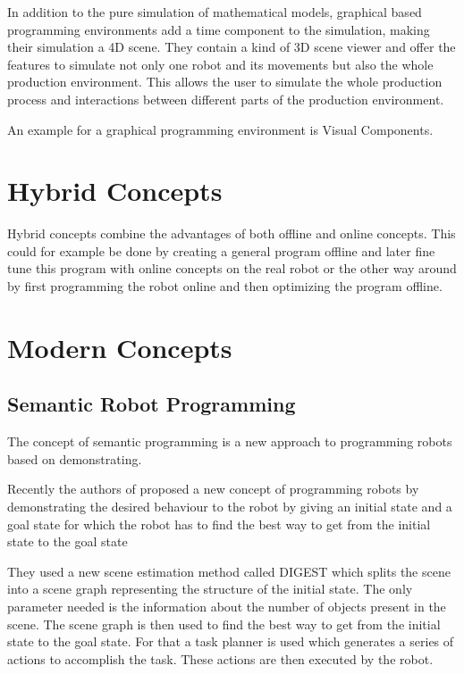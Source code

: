 \documentclass[conference]{IEEEtran}
\begin{document}

        In addition to the pure simulation of mathematical models, graphical based programming environments add a time component to the simulation, making their simulation a 4D scene.
        They contain a kind of 3D scene viewer and offer the features to simulate not only one robot and its movements but also the whole production environment. This allows the user to simulate the whole production process and interactions between different parts of the production environment. %

        An example for a graphical programming environment is Visual Components. %

\section{Hybrid Concepts}

    Hybrid concepts combine the advantages of both offline and online concepts.
    This could for example be done by creating a general program offline and later  fine tune this program with online concepts on the real robot or the other way around by first programming the robot online and then optimizing the program offline.
    \cite[p. 186]{b4}

\section{Modern Concepts} %

    \subsection{Semantic Robot Programming}

        The concept of semantic programming is a new approach to programming robots based on demonstrating.

        Recently the authors of \cite{p1} proposed a new concept of programming robots by demonstrating the desired behaviour to the robot by giving an initial state and a goal state for which the robot has to find the best way to get from the initial state to the goal state

        They used a new scene estimation method called DIGEST which splits the scene into a scene graph representing the structure of the initial state. The only parameter needed is the information about the number of objects present in the scene. The scene graph is then used to find the best way to get from the initial state to the goal state.
        For that a task planner is used which generates a series of actions to accomplish the task. These actions are then executed by the robot. %
        \cite[p. 2]{p1}
\end{document}
